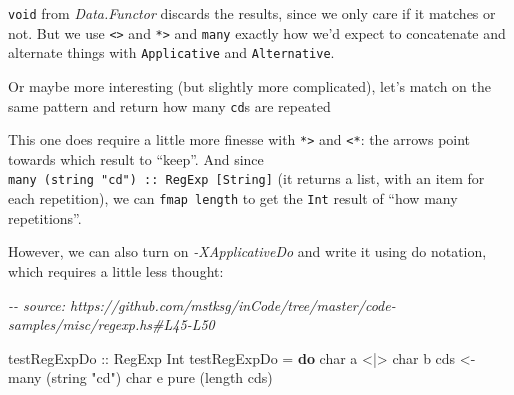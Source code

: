\documentclass[]{article}
\newenvironment{Shaded}{}{}
\newcommand{\CharTok}[1]{\textcolor[rgb]{0.25,0.44,0.63}{#1}}
\newcommand{\CommentTok}[1]{\textcolor[rgb]{0.38,0.63,0.69}{\textit{#1}}}
\newcommand{\DataTypeTok}[1]{\textcolor[rgb]{0.56,0.13,0.00}{#1}}
\newcommand{\FunctionTok}[1]{\textcolor[rgb]{0.02,0.16,0.49}{#1}}
\newcommand{\KeywordTok}[1]{\textcolor[rgb]{0.00,0.44,0.13}{\textbf{#1}}}
\newcommand{\NormalTok}[1]{#1}
\newcommand{\OperatorTok}[1]{\textcolor[rgb]{0.40,0.40,0.40}{#1}}
\newcommand{\OtherTok}[1]{\textcolor[rgb]{0.00,0.44,0.13}{#1}}
\newcommand{\StringTok}[1]{\textcolor[rgb]{0.25,0.44,0.63}{#1}}
\begin{document}
\texttt{void} from \emph{Data.Functor} discards the results, since we only care
if it matches or not. But we use \texttt{\textless{}\textbar{}\textgreater{}}
and \texttt{*\textgreater{}} and \texttt{many} exactly how we'd expect to
concatenate and alternate things with \texttt{Applicative} and
\texttt{Alternative}.

Or maybe more interesting (but slightly more complicated), let's match on the
same pattern and return how many \texttt{cd}s are repeated

\begin{Shaded}
\end{Shaded}

This one does require a little more finesse with \texttt{*\textgreater{}} and
\texttt{\textless{}*}: the arrows point towards which result to ``keep''. And
since \texttt{many\ (string\ "cd")\ ::\ RegExp\ {[}String{]}} (it returns a
list, with an item for each repetition), we can \texttt{fmap\ length} to get the
\texttt{Int} result of ``how many repetitions''.

However, we can also turn on \emph{-XApplicativeDo} and write it using do
notation, which requires a little less thought:

\begin{Shaded}
\begin{Highlighting}[]
\CommentTok{{-}{-} source: https://github.com/mstksg/inCode/tree/master/code{-}samples/misc/regexp.hs\#L45{-}L50}

\OtherTok{testRegExpDo ::} \DataTypeTok{RegExp} \DataTypeTok{Int}
\NormalTok{testRegExpDo }\OtherTok{=} \KeywordTok{do}
\NormalTok{    char }\CharTok{\textquotesingle{}a\textquotesingle{}} \OperatorTok{<|>}\NormalTok{ char }\CharTok{\textquotesingle{}b\textquotesingle{}}
\NormalTok{    cds }\OtherTok{<{-}}\NormalTok{ many (string }\StringTok{"cd"}\NormalTok{)}
\NormalTok{    char }\CharTok{\textquotesingle{}e\textquotesingle{}}
    \FunctionTok{pure}\NormalTok{ (}\FunctionTok{length}\NormalTok{ cds)}
\end{Highlighting}
\end{Shaded}
\end{document}
